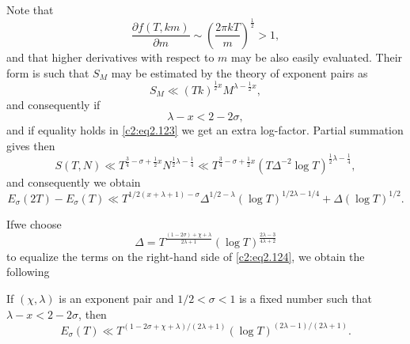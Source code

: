 Note that
$$
\frac{\partial f(T, km)}{\partial m} \sim \left(\frac{2 \pi kT}{m}
\right)^{\frac{1}{2}}  > 1,
$$
and that higher derivatives with respect to $m$ may be also easily
evaluated. Their form is such that $S_M$ may be estimated by the
theory of exponent pairs as
$$
S_M \ll (Tk)^{\frac{1}{2}x}M^{\lambda - \frac{1}{2} x},
$$
and consequently
{}
if
\begin{equation}
  \lambda - x < 2 - 2 \sigma,\label{c2:eq2.123}
\end{equation}
and if equality holds in \eqref{c2:eq2.123} we get an extra
log-factor. Partial summation gives then
$$ 
S(T, N) \ll T^{\frac{3}{4} - \sigma + \frac{1}{2} x} N^{\frac{1}{2} \lambda - \frac{1}{4}} \ll T^{\frac{3}{4}-
\sigma + \frac{1}{2} x} (T \Delta ^{-2} \log T)^{\frac{1}{2} \lambda - \frac{1}{4}},
$$ 
and consequently we obtain
\begin{equation}
  E_\sigma (2T) - E_\sigma (T) \ll T^{1/2 (x + \lambda+1)- \sigma}
  \Delta ^{1/2 - \lambda} (\log T)^{1/2 \lambda - 1/4} +
  \Delta (\log T)^{1/2}. \label{c2:eq2.124}
\end{equation}

If\pageoriginale we choose
$$
\Delta   =T^{\frac{(1- 2 \sigma) + \chi + \lambda}{2 \lambda +1}} (\log
T)^{\frac{2 \lambda -3}{4 \lambda + 2}}
$$
to equalize the terms on the right-hand side of \eqref{c2:eq2.124}, we
obtain the following

\begin{thm}\label{c2:thm2.11}
  If $(\chi, \lambda)$ is an exponent pair and $1/2 < \sigma < 1$ is a
  fixed number such that $\lambda - x < 2 - 2 \sigma$, then 
  \begin{equation}
    E_\sigma (T) \ll T^{(1- 2 \sigma + \chi + \lambda)/(2 \lambda +1)}
    (\log T)^{(2 \lambda -1)/(2 \lambda +1)}.\label{c2:eq2.125}
  \end{equation}
\end{thm}

